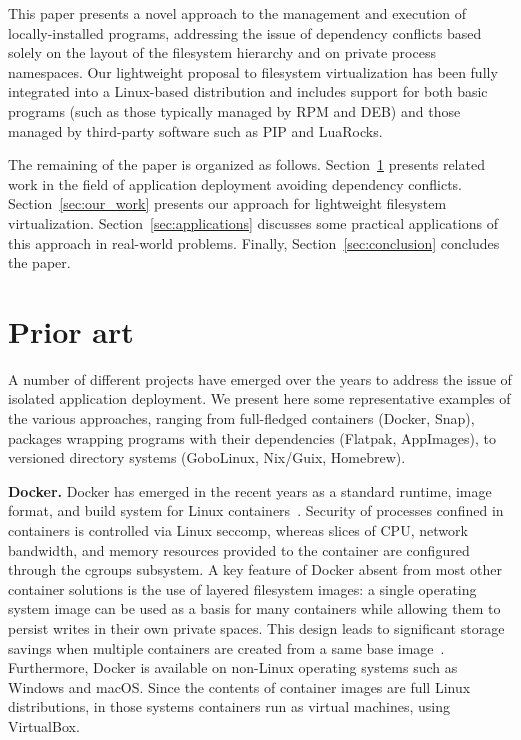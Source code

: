 \documentclass[sigplan, anonymous, 10pt]{acmart}
\begin{document}
This paper presents a novel approach to the management and execution of
locally-installed programs, addressing the issue of dependency conflicts based
solely on the layout of the filesystem hierarchy and on private process
namespaces. Our lightweight proposal to filesystem virtualization has been
fully integrated into a Linux-based distribution and includes support for both
basic programs (such as those typically managed by RPM and DEB) and those
managed by third-party software such as PIP and LuaRocks.

The remaining of the paper is organized as follows.
Section~\ref{sec:prior_art} presents related work in the field of application
deployment avoiding dependency conflicts. Section~\ref{sec:our_work} presents
our approach for lightweight filesystem virtualization.
Section~\ref{sec:applications} discusses some practical applications of this
approach in real-world problems. Finally, Section~\ref{sec:conclusion}
concludes the paper.

\section{Prior art}\label{sec:prior_art}
A number of different projects have emerged over the years to address the issue of
isolated application deployment. We present here some representative examples of
the various approaches, ranging from full-fledged containers (Docker, Snap),
packages wrapping programs with their dependencies (Flatpak, AppImages),
to versioned directory systems (GoboLinux, Nix/Guix, Homebrew).

\textbf{Docker.}
Docker has emerged in the recent years as a standard runtime, image format, and build
system for Linux containers~\cite{fink2014:docker}. Security of processes confined in
containers is controlled via Linux seccomp, whereas slices of CPU, network bandwidth,
and memory resources provided to the container are configured through the cgroups
subsystem. A key feature of Docker
absent from most other container solutions is the use of layered filesystem images:
a single operating system image can be used as a basis for many containers while allowing
them to persist writes in their own private spaces. This design leads to significant
storage savings when multiple containers are created from a same base
image~\cite{felter2015:comparison}.
Furthermore, Docker is available on non-Linux operating systems such as Windows and
macOS. Since the contents of container images are full Linux distributions, in
those systems containers run as virtual machines, using VirtualBox.
\end{document}
